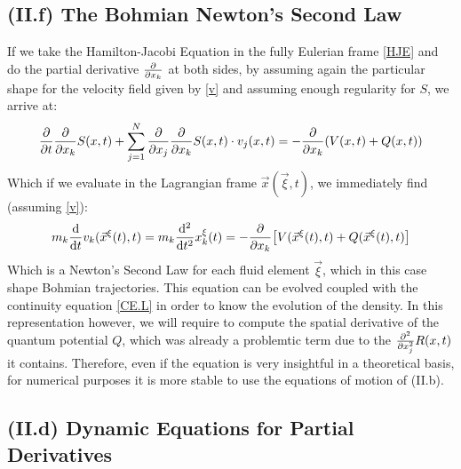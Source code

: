 \documentclass[11pt, a4paper]{article} %
\begin{document}
\subsection*{(II.f) The Bohmian Newton's Second Law}
If we take the Hamilton-Jacobi Equation in the fully Eulerian frame \eqref{HJE} and do the partial derivative $\pdv{}{x_k}$ at both sides, by assuming again the particular shape for the velocity field given by \eqref{v} and assuming enough regularity for $S$, we arrive at:
\begin{equation}
\pdv{}{t}\pdv{}{x_k}S(x,t)+\sum_{j=1}^N\pdv{}{x_j}\pdv{}{x_k}S(x,t)\cdot v_j(x,t)=-\pdv{}{x_k}\qty(V(x,t)+Q(x,t))
\end{equation}
Which if we evaluate in the Lagrangian frame $\vec{x}(\vec{\xi},t)$, we immediately find (assuming \eqref{v}):
\begin{equation}
m_k\dv{}{t}v_k(\vec{x}^\xi(t),t)=m_k\dv[2]{}{t}x^\xi_k(t)=-\pdv{}{x_k}\qty[V(\vec{x}^\xi(t),t)+Q(\vec{x}^\xi(t),t) ]\vspace{-0.1cm}
\end{equation}
Which is a Newton's Second Law for each fluid element $\vec{\xi}$, which in this case shape Bohmian trajectories. This equation can be evolved coupled with the continuity equation \eqref{CE.L} in order to know the evolution of the density. In this representation however, we will require to compute the spatial derivative of the quantum potential $Q$, which was already a problemtic term due to the $\pdv[2]{}{x_j}R(x,t)$ it contains. Therefore, even if the equation is very insightful in a theoretical basis, for numerical purposes it is more stable to use the equations of motion of (II.b).\vspace{-0.2cm}


\subsection*{(II.d) Dynamic Equations for Partial Derivatives}\vspace{-0.2cm}
\end{document}
